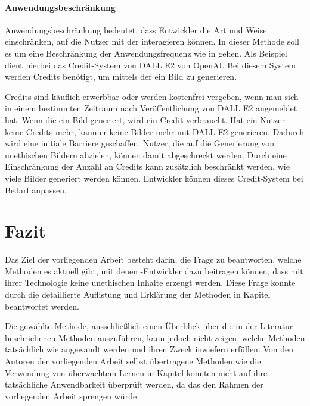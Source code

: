 \documentclass[hidelinks,12pt]{report}
\begin{document}
\subsubsection{Anwendungsbeschränkung} %
Anwendungsbeschränkung bedeutet, dass Entwickler die Art und Weise einschränken, auf die Nutzer mit der  interagieren können. In dieser Methode soll es um eine Beschränkung der Anwendungsfrequenz wie in \cite{Jang} gehen. Als Beispiel dient hierbei das Credit-System von DALL E2 von OpenAI. Bei diesem System werden Credits benötigt, um mittels der  ein Bild zu generieren.

Credits sind käuflich erwerbbar oder werden kostenfrei vergeben, wenn man sich in einem bestimmten Zeitraum nach Veröffentlichung von DALL E2 angemeldet hat. Wenn die  ein Bild generiert, wird ein Credit verbraucht. Hat ein Nutzer keine Credits mehr, kann er keine Bilder mehr mit DALL E2 generieren. Dadurch wird eine initiale Barriere geschaffen. Nutzer, die auf die Generierung von unethischen Bildern abzielen, können damit abgeschreckt werden. Durch eine Einschränkung der Anzahl an Credits kann zusätzlich beschränkt werden, wie viele Bilder generiert werden können. Entwickler können dieses Credit-System bei Bedarf anpassen.



\newpage
\begingroup
\let\clearpage\relax

\chapter{Fazit}
Das Ziel der vorliegenden Arbeit besteht darin, die Frage zu beantworten, welche Methoden es aktuell gibt, mit denen -Entwickler dazu beitragen können, dass mit ihrer Technologie keine unethischen Inhalte erzeugt werden. Diese Frage konnte durch die detaillierte Auflistung und Erklärung der Methoden in Kapitel  beantwortet werden. 

Die gewählte Methode, ausschließlich einen Überblick über die in der Literatur beschriebenen Methoden auszuführen, kann jedoch nicht zeigen, welche Methoden tatsächlich wie angewandt werden und ihren Zweck inwiefern erfüllen. Von den Autoren der vorliegenden Arbeit selbst übertragene Methoden wie die Verwendung von überwachtem Lernen in Kapitel  konnten nicht auf ihre tatsächliche Anwendbarkeit überprüft werden, da das den Rahmen der vorliegenden Arbeit sprengen würde. \\
\end{document}
